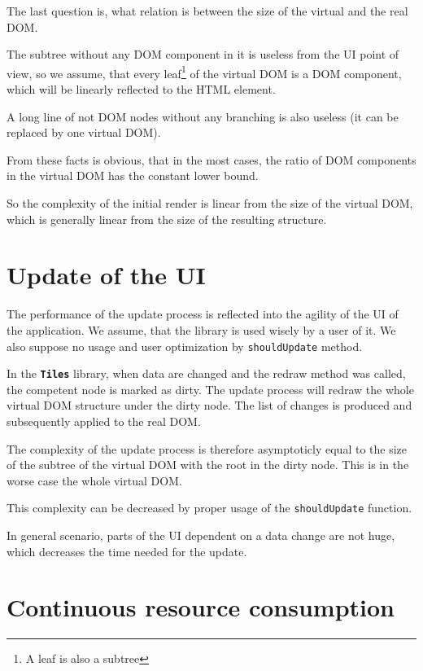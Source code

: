 \documentclass[oneside, 12pt]{book}
\newcommand{\tiles}[0]{\textbf{\texttt{Tiles}} }
\begin{document}
    The last question is, what relation is between the size of the virtual and the real DOM. 

    The subtree without any DOM component in it is useless from the UI point of view, 
    so we assume, that every leaf\footnote{A leaf is also a subtree} of the virtual DOM is a DOM component, 
    which will be linearly reflected to the HTML element.

    A long line of not DOM nodes without any branching is also useless (it can be replaced by one virtual DOM).

    From these facts is obvious, that in the most cases, the ratio of DOM components in the virtual DOM has the constant lower bound.

    So the complexity of the initial render is linear from the size of the virtual DOM, 
    which is generally linear from the size of the resulting structure.

  \section{Update of the UI}\label{sec:performance-update}

    The performance of the update process is reflected into the agility of the UI of the application.
    We assume, that the library is used wisely by a user of it.
    We also suppose no usage and user optimization by \texttt{shouldUpdate} method.

    In the \tiles library, when data are changed and the redraw method was called, 
    the competent node is marked as dirty. 
    The update process will redraw the whole virtual DOM structure under the dirty node. 
    The list of changes is produced and subsequently applied to the real DOM. 

    The complexity of the update process is therefore asymptoticly equal 
    to the size of the subtree of the virtual DOM with the root in the dirty node.
    This is in the worse case the whole virtual DOM. 

    This complexity can be decreased by proper usage of the \texttt{shouldUpdate} function. 

    In general scenario, parts of the UI dependent on a data change are not huge, 
    which decreases the time needed for the update.  

  \section{Continuous resource consumption}\label{sec:performance-continuous}
    
\end{document}
